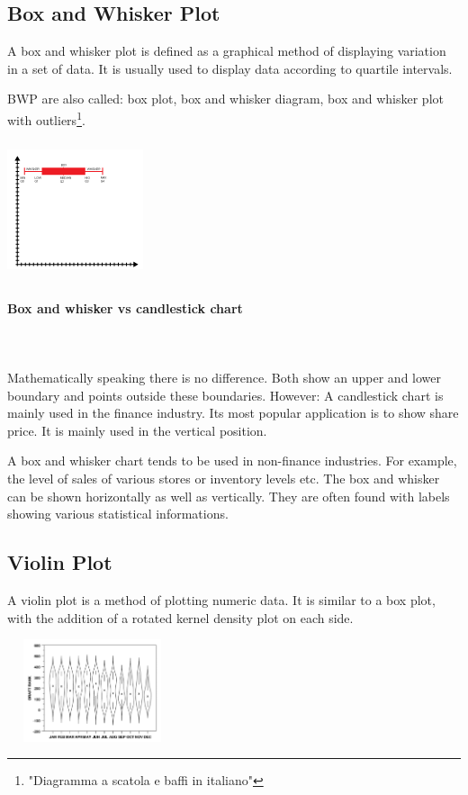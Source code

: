 \documentclass{article}
\begin{document}
\subsection{Box and Whisker Plot}
A box and whisker plot is defined as a graphical method of displaying variation in a set of data. It is usually used to display data according to quartile intervals.

BWP are also called: box plot, box and whisker diagram, box and whisker plot with outliers\footnote{"Diagramma a scatola e baffi in italiano"}.

\includegraphics[width=4cm, height=4cm]{box_whisker_chart}

\paragraph{Box and whisker vs candlestick chart}\mbox{} \\
\mbox{} \\
Mathematically speaking there is no difference. Both show an upper and lower boundary and points outside these boundaries. However:
A candlestick chart is mainly used in the finance industry. Its most popular application is to show share price. It is mainly used in the vertical position.

A  box and whisker chart tends to be used in non-finance industries. For example, the level of sales of various stores or inventory levels etc. The box and whisker can be shown horizontally as well as vertically. They are often found with labels showing various statistical informations. 

\subsection{Violin Plot}
A violin plot is a method of plotting numeric data. It is similar to a box plot, with the addition of a rotated kernel density plot on each side.

\includegraphics[width=5cm, height=3cm]{violin_chart}
\end{document}
